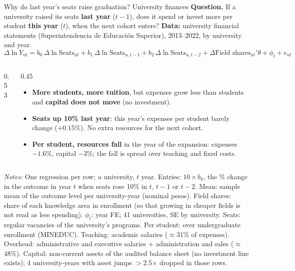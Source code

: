 \documentclass{beamer}
\begin{document}
\begin{frame}[label=d5-tm1-finance]{Why do last year's seats raise graduation? University finances}
\scriptsize
\textbf{Question.} If a university raised its seats \textbf{last year} ($t-1$), does it spend or invest more per student \textbf{this year} ($t$), when the next cohort enters?
\textbf{Data:} university financial statements (Superintendencia de Educaci\'on Superior), 2013--2022, by university and year.
\vspace{-0.2cm}
\[
\Delta \ln Y_{ut} = b_0\, \Delta \ln \text{Seats}_{ut} + b_1\, \Delta \ln \text{Seats}_{u,t-1} + b_2\, \Delta \ln \text{Seats}_{u,t-2} + \Delta \text{Field shares}_{ut}'\theta + \phi_t + e_{ut}
\]
\vspace{-0.35cm}
\begin{columns}[T,onlytextwidth]
\begin{column}{0.53\textwidth}
\centering
\tiny
\resizebox{0.88\linewidth}{!}{}
\end{column}
\begin{column}{0.45\textwidth}
\scriptsize
\begin{itemize}
    \setlength{\itemsep}{3pt}
    \item \textbf{More students, more tuition}, but expenses grow less than students and \textbf{capital does not move} (no investment).
    \item \textbf{Seats up 10\% last year}: this year's expenses per student barely change ($+0.15\%$). No extra resources for the next cohort.
    \item \textbf{Per student, resources fall} in the year of the expansion: expenses $-1.6\%$, capital $-3\%$; the fall is spread over teaching and fixed costs.
\end{itemize}
\end{column}
\end{columns}

\vspace{0.1cm}
\parbox{0.97\textwidth}{\tiny \textit{Notes:} One regression per row; $u$ university, $t$ year. Entries: $10\times b_k$, the \% change in the outcome in year $t$ when seats rose 10\% in $t$, $t-1$ or $t-2$. Mean: sample mean of the outcome level per university-year (nominal pesos). Field shares: share of each knowledge area in enrollment (so that growing in cheaper fields is not read as less spending). $\phi_t$: year FE; 41 universities, SE by university. Seats: regular vacancies of the university's programs. Per student: over undergraduate enrollment (MINEDUC). Teaching: academic salaries ($\approx$31\% of expenses). Overhead: administrative and executive salaries + administration and sales ($\approx$48\%). Capital: non-current assets of the audited balance sheet (no investment line exists); 4 university-years with asset jumps $>$2.5$\times$ dropped in those rows.}
\end{frame}
\end{document}
